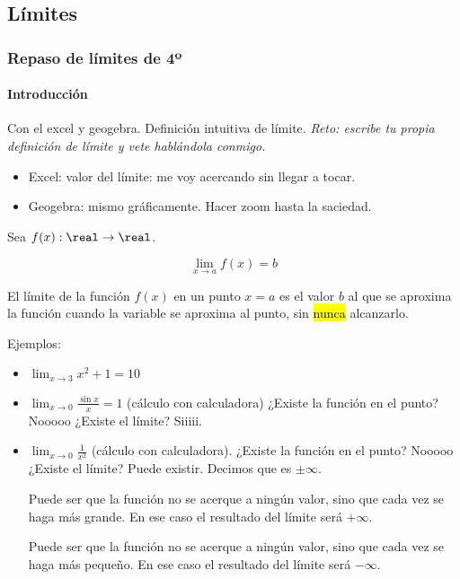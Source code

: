 \subsection{Límites}

\subsubsection{Repaso de límites de 4º}



\paragraph{Introducción}

Con el excel y geogebra. Definición intuitiva de límite. \textit{Reto: escribe tu propia definición de límite y vete hablándola conmigo.}

\begin{itemize}
	\item Excel: valor del límite: me voy acercando sin llegar a tocar.
	\item Geogebra: mismo gráficamente. Hacer zoom hasta la saciedad.
\end{itemize}

\begin{defn}
Sea $f(x):\real\to\real$.

\[\lim_{x\to a} f(x) = b\]

El límite de la función $f(x)$ en un punto $x=a$ es el valor $b$ al que se aproxima la función cuando la variable se aproxima al punto, sin \hl{nunca} alcanzarlo.
\end{defn}

Ejemplos:
\begin{itemize}
	\item $\lim_{x\to 3} x^2 + 1 = 10$
	\item $\lim_{x\to 0} \frac{\sin x}{x} = 1$ (cálculo con calculadora) ¿Existe la función en el punto? Nooooo ¿Existe el límite? Siiiii.
	\item $\lim_{x\to 0} \frac{1}{x^2}$ (cálculo con calculadora). ¿Existe la función en el punto? Nooooo ¿Existe el límite? Puede existir. Decimos que es $\pm\infty$.

\obs Puede ser que la función no se acerque a ningún valor, sino que cada vez se haga más grande. En ese caso el resultado del límite será $+\infty$.

\obs Puede ser que la función no se acerque a ningún valor, sino que cada vez se haga más pequeño. En ese caso el resultado del límite será $-\infty$.
\end{itemize}



